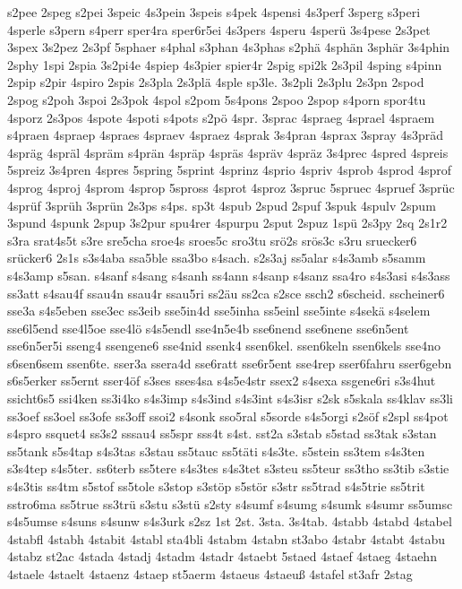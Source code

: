 {s2pee
2speg
s2pei
3speic
4s3pein
3speis
s4pek
4spensi
4s3perf
3sperg
s3peri
4sperle
s3pern
s4perr
sper4ra
sper6r5ei
4s3pers
4speru
4sperü
3s4pese
2s3pet
3spex
3s2pez
2s3pf
5sphaer
s4phal
s3phan
4s3phas
s2phä
4sphän
3sphär
3s4phin
2sphy
1spi
2spia
3s2pi4e
4spiep
4s3pier
spier4r
2spig
spi2k
2s3pil
4sping
s4pinn
2spip
s2pir
4spiro
2spis
2s3pla
2s3plä
4sple
sp3le.
3s2pli
2s3plu
2s3pn
2spod
2spog
s2poh
3spoi
2s3pok
4spol
s2pom
5s4pons
2spoo
2spop
s4porn
spor4tu
4sporz
2s3pos
4spote
4spoti
s4pots
s2pö
4spr.
3sprac
4spraeg
4sprael
4spraem
s4praen
4spraep
4spraes
4spraev
4spraez
4sprak
3s4pran
4sprax
3spray
4s3präd
4spräg
4spräl
4spräm
s4prän
4spräp
4spräs
4spräv
4spräz
3s4prec
4spred
4spreis
5spreiz
3s4pren
4spres
5spring
5sprint
4sprinz
4sprio
4spriv
4sprob
4sprod
4sprof
4sprog
4sproj
4sprom
4sprop
5spross
4sprot
4sproz
3spruc
5spruec
4spruef
3sprüc
4sprüf
3sprüh
3sprün
2s3ps
s4ps.
sp3t
4spub
2spud
2spuf
3spuk
4spulv
2spum
3spund
4spunk
2spup
3s2pur
spu4rer
4spurpu
2sput
2spuz
1spü
2s3py
2sq
2s1r2
s3ra
srat4s5t
s3re
sre5cha
sroe4s
sroes5c
sro3tu
srö2s
srös3c
s3ru
sruecker6
srücker6
2s1s
s3s4aba
ssa5ble
ssa3bo
s4sach.
s2s3aj
ss5alar
s4s3amb
s5samm
s4s3amp
s5san.
s4sanf
s4sang
s4sanh
ss4ann
s4sanp
s4sanz
ssa4ro
s4s3asi
s4s3ass
ss3att
s4sau4f
ssau4n
ssau4r
ssau5ri
ss2äu
ss2ca
s2sce
ssch2
s6scheid.
sscheiner6
sse3a
s4s5eben
sse3ec
ss3eib
sse5in4d
sse5inha
ss5einl
sse5inte
s4sekä
s4selem
sse6l5end
sse4l5oe
sse4lö
s4s5endl
sse4n5e4b
sse6nend
sse6nene
sse6n5ent
sse6n5er5i
sseng4
ssengene6
sse4nid
ssenk4
ssen6kel.
ssen6keln
ssen6kels
sse4no
s6sen6sem
ssen6te.
sser3a
ssera4d
sse6ratt
sse6r5ent
sse4rep
sser6fahru
sser6gebn
s6s5erker
ss5ernt
sser4öf
s3ses
sses4sa
s4s5e4str
ssex2
s4sexa
ssgene6ri
s3s4hut
ssicht6s5
ssi4ken
ss3i4ko
s4s3imp
s4s3ind
s4s3int
s4s3isr
s2sk
s5skala
ss4klav
ss3li
ss3oef
ss3oel
ss3ofe
ss3off
ssoi2
s4sonk
sso5ral
s5sorde
s4s5orgi
s2söf
s2spl
ss4pot
s4spro
ssquet4
ss3s2
sssau4
ss5spr
sss4t
s4st.
sst2a
s3stab
s5stad
ss3tak
s3stan
ss5tank
s5s4tap
s4s3tas
s3stau
ss5tauc
ss5täti
s4s3te.
s5stein
ss3tem
s4s3ten
s3s4tep
s4s5ter.
ss6terb
ss5tere
s4s3tes
s4s3tet
s3steu
ss5teur
ss3tho
ss3tib
s3stie
s4s3tis
ss4tm
s5stof
ss5tole
s3stop
s3stöp
s5stör
s3str
ss5trad
s4s5trie
ss5trit
sstro6ma
ss5true
ss3trü
s3stu
s3stü
s2sty
s4sumf
s4sumg
s4sumk
s4sumr
ss5umsc
s4s5umse
s4suns
s4sunw
s4s3urk
s2sz
1st
2st.
3sta.
3s4tab.
4stabb
4stabd
4stabel
4stabfl
4stabh
4stabit
4stabl
sta4bli
4stabm
4stabn
st3abo
4stabr
4stabt
4stabu
4stabz
st2ac
4stada
4stadj
4stadm
4stadr
4staebt
5staed
4staef
4staeg
4staehn
4staele
4staelt
4staenz
4staep
st5aerm
4staeus
4staeuß
4stafel
st3afr
2stag
}
